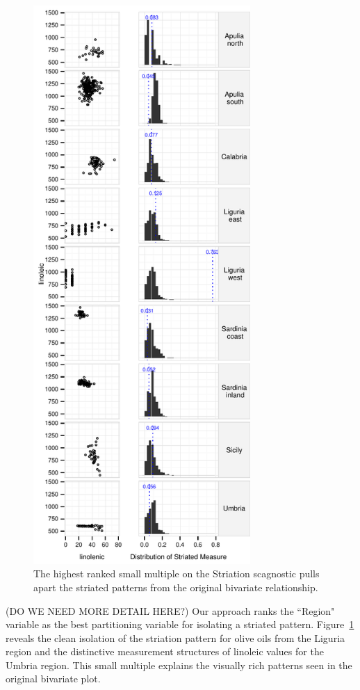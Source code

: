 \begin{figure}
	\includegraphics[width=3.25in]{images/15_729035813077-region.pdf}
	  \caption{The highest ranked small multiple on the Striation scagnostic pulls apart the striated patterns from the original bivariate relationship. }
	 \label{fig:vrich_sm}
\end{figure}

(DO WE NEED MORE DETAIL HERE?)
Our approach ranks the ``Region" variable as the best partitioning variable for isolating a striated pattern. Figure~\ref{fig:vrich_sm} reveals the clean isolation of the striation pattern for olive oils from the Liguria region and the distinctive measurement structures of linoleic values for the Umbria region. This small multiple explains the visually rich patterns seen in the original bivariate plot. 


